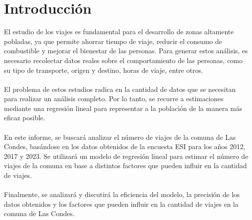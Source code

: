 \documentclass[12pt]{article} %
\begin{document}


\setcounter{page}{1} %

\section{Introducción}

El estudio de los viajes es fundamental para el desarrollo de zonas altamente pobladas, ya que permite ahorrar tiempo de viaje, reducir el consumo de combustible y mejorar el bienestar de las personas. Para generar estos análisis, es necesario recolectar datos reales sobre el comportamiento de las personas, como su tipo de transporte, origen y destino, horas de viaje, entre otros.
\\ \\
El problema de estos estudios radica en la cantidad de datos que se necesitan para realizar un análisis completo. Por lo tanto, se recurre a estimaciones mediante una regresión lineal para representar a la población de la manera más eficaz posible.
\\ \\
En este informe, se buscará analizar el número de viajes de la comuna de Las Condes, basándose en los datos obtenidos de la encuesta ESI para los años 2012, 2017 y 2023. Se utilizará un modelo de regresión lineal para estimar el número de viajes de la comuna en base a distintos factores que pueden influir en la cantidad de viajes.
\\ \\
Finalmente, se analizará y discutirá la eficiencia del modelo, la precisión de los datos obtenidos y los factores que pueden influir en la cantidad de viajes en la comuna de Las Condes.
\end{document}
